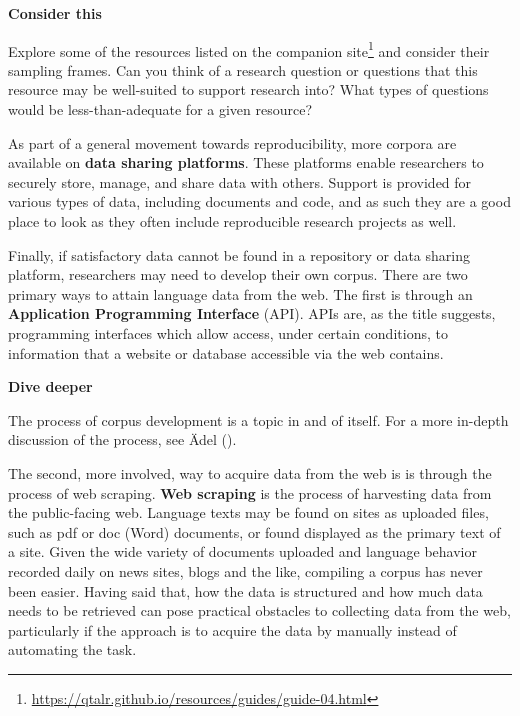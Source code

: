\documentclass[
  letterpaper,
]{latex/krantz}
\theoremstyle{definition}
\theoremstyle{remark}
\DeclareRobustCommand{\href}[2]{#2\footnote{\url{#1}}}
\begin{document}
\begin{tcolorbox}[enhanced jigsaw, colframe=quarto-callout-color-frame, breakable, bottomrule=.15mm, arc=.35mm, left=2mm, opacityback=0, rightrule=.15mm, colback=white, toprule=.15mm, leftrule=.75mm]

\textbf{ Consider this}

Explore some of the resources listed on the
\href{https://qtalr.github.io/resources/guides/guide-04.html}{companion
site} and consider their sampling frames. Can you think of a research
question or questions that this resource may be well-suited to support
research into? What types of questions would be less-than-adequate for a
given resource?

\end{tcolorbox}

As part of a general movement towards reproducibility, more corpora are
available on \textbf{data sharing
platforms}. These platforms enable researchers to securely store,
manage, and share data with others. Support is provided for various
types of data, including documents and code, and as such they are a good
place to look as they often include reproducible research projects as
well.

Finally, if satisfactory data cannot be found in a repository or data
sharing platform, researchers may need to develop their own corpus.
There are two primary ways to attain language data from the web. The
first is through an \textbf{Application Programming Interface} (API).
APIs are, as the title suggests, programming interfaces which allow
access, under certain conditions, to information that a website or
database accessible via the web contains.

\begin{tcolorbox}[enhanced jigsaw, colframe=quarto-callout-color-frame, breakable, bottomrule=.15mm, arc=.35mm, left=2mm, opacityback=0, rightrule=.15mm, colback=white, toprule=.15mm, leftrule=.75mm]

\textbf{ Dive deeper}

The process of corpus development is a topic in and of itself. For a
more in-depth discussion of the process, see Ädel
().

\end{tcolorbox}

The second, more involved, way to acquire data from the web is is
through the process of web scraping. \textbf{Web scraping} is the
process of harvesting data from the public-facing web. Language texts
may be found on sites as uploaded files, such as pdf or doc (Word)
documents, or found displayed as the primary text of a site. Given the
wide variety of documents uploaded and language behavior recorded daily
on news sites, blogs and the like, compiling a corpus has never been
easier. Having said that, how the data is structured and how much data
needs to be retrieved can pose practical obstacles to collecting data
from the web, particularly if the approach is to acquire the data by
manually instead of automating the task.
\end{document}
